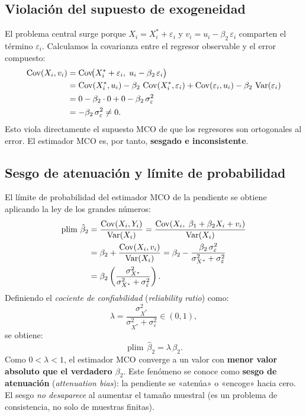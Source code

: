 \documentclass[12pt, letterpaper]{article}
\newcommand{\plim}{\operatorname{plim}}
\newcommand{\Cov}{\operatorname{Cov}}
\newcommand{\Var}{\operatorname{Var}}
\begin{document}
\subsection{Violación del supuesto de exogeneidad}

El problema central surge porque $X_i = X_i^* + \varepsilon_i$ y
$v_i = u_i - \beta_2\,\varepsilon_i$ comparten el término $\varepsilon_i$.
Calculamos la covarianza entre el regresor observable y el error compuesto:
\begin{align}
  \Cov(X_i, v_i)
    &= \Cov\!\bigl(X_i^* + \varepsilon_i,\; u_i - \beta_2\,\varepsilon_i\bigr) \notag\\
    &= \Cov(X_i^*, u_i) - \beta_2\,\Cov(X_i^*, \varepsilon_i)
       + \Cov(\varepsilon_i, u_i) - \beta_2\,\Var(\varepsilon_i) \notag\\
    &= 0 - \beta_2 \cdot 0 + 0 - \beta_2\,\sigma_\varepsilon^2 \notag\\
    &= -\beta_2\,\sigma_\varepsilon^2 \neq 0.
  \label{eq:cov_no_nula}
\end{align}
Esto viola directamente el supuesto MCO de que los regresores son
ortogonales al error. El estimador MCO es, por tanto, \textbf{sesgado e
inconsistente}.

\subsection{Sesgo de atenuación y límite de probabilidad}

El límite de probabilidad del estimador MCO de la pendiente se obtiene
aplicando la ley de los grandes números:
\begin{align}
  \plim\,\hat{\beta}_2
    &= \frac{\Cov(X_i, Y_i)}{\Var(X_i)}
     = \frac{\Cov(X_i,\; \beta_1 + \beta_2 X_i + v_i)}{\Var(X_i)} \notag\\
    &= \beta_2 + \frac{\Cov(X_i, v_i)}{\Var(X_i)}
     = \beta_2 - \frac{\beta_2\,\sigma_\varepsilon^2}{\sigma_{X^*}^2 + \sigma_\varepsilon^2} \notag\\
    &= \beta_2 \left(\frac{\sigma_{X^*}^2}{\sigma_{X^*}^2 + \sigma_\varepsilon^2}\right).
  \label{eq:plim}
\end{align}
Definiendo el \emph{cociente de confiabilidad} (\textit{reliability ratio})
como:
\[
  \lambda = \frac{\sigma_{X^*}^2}{\sigma_{X^*}^2 + \sigma_\varepsilon^2}
  \in (0, 1),
\]
se obtiene:
\begin{equation}
  \plim\,\hat{\beta}_2 = \lambda\,\beta_2.
  \label{eq:atenuacion}
\end{equation}
Como $0 < \lambda < 1$, el estimador MCO converge a un valor con
\textbf{menor valor absoluto que el verdadero $\beta_2$}. Este fenómeno
se conoce como \textbf{sesgo de atenuación} (\textit{attenuation bias}):
la pendiente se «atenúa» o «encoge» hacia cero. El sesgo \emph{no desaparece}
al aumentar el tamaño muestral (es un problema de consistencia, no solo de
muestras finitas).
\end{document}
